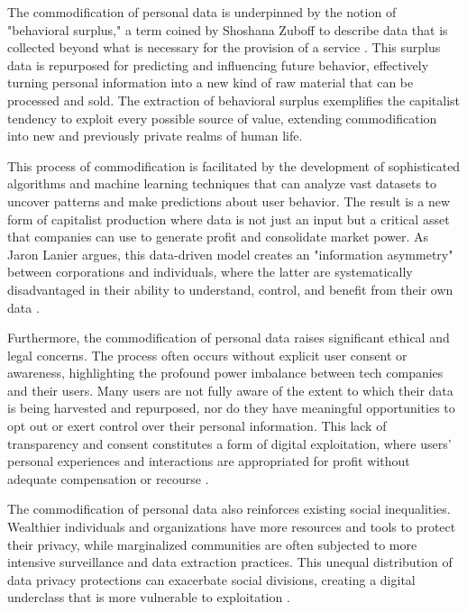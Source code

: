 \begin{refsection}
The commodification of personal data is underpinned by the notion of "behavioral surplus," a term coined by Shoshana Zuboff to describe data that is collected beyond what is necessary for the provision of a service \cite[pp.~86-88]{zuboff2020age}. This surplus data is repurposed for predicting and influencing future behavior, effectively turning personal information into a new kind of raw material that can be processed and sold. The extraction of behavioral surplus exemplifies the capitalist tendency to exploit every possible source of value, extending commodification into new and previously private realms of human life.

This process of commodification is facilitated by the development of sophisticated algorithms and machine learning techniques that can analyze vast datasets to uncover patterns and make predictions about user behavior. The result is a new form of capitalist production where data is not just an input but a critical asset that companies can use to generate profit and consolidate market power. As Jaron Lanier argues, this data-driven model creates an "information asymmetry" between corporations and individuals, where the latter are systematically disadvantaged in their ability to understand, control, and benefit from their own data \cite[pp.~29-31]{lanier2018ten}.

Furthermore, the commodification of personal data raises significant ethical and legal concerns. The process often occurs without explicit user consent or awareness, highlighting the profound power imbalance between tech companies and their users. Many users are not fully aware of the extent to which their data is being harvested and repurposed, nor do they have meaningful opportunities to opt out or exert control over their personal information. This lack of transparency and consent constitutes a form of digital exploitation, where users' personal experiences and interactions are appropriated for profit without adequate compensation or recourse \cite[pp.~150-152]{cohen2019between}.

The commodification of personal data also reinforces existing social inequalities. Wealthier individuals and organizations have more resources and tools to protect their privacy, while marginalized communities are often subjected to more intensive surveillance and data extraction practices. This unequal distribution of data privacy protections can exacerbate social divisions, creating a digital underclass that is more vulnerable to exploitation \cite[pp.~66-69]{noble2018algorithms}.


\end{refsection}
